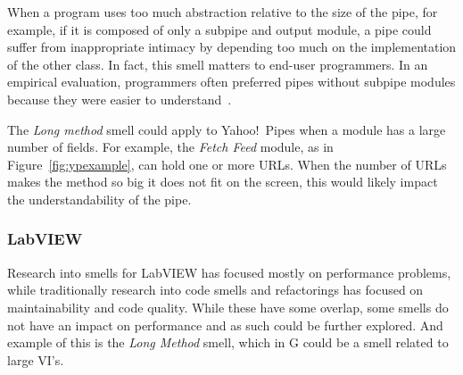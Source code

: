 \documentclass[10pt,conference,compsocconf]{IEEEtran}
\begin{document}
When a program uses too much abstraction relative to the size of the pipe, for example, if it is composed of only a subpipe and output module, a pipe could suffer from inappropriate intimacy by depending too much on the implementation of the other class. In fact, this smell matters to end-user programmers.  In an empirical evaluation, programmers often preferred pipes without subpipe modules because they were easier to understand~\cite{StoleeTSE2013}. 

The \emph{Long method} smell could apply to Yahoo!\ Pipes when a module has a large number of fields. For example, the \emph{Fetch Feed} module, as in Figure~\ref{fig:ypexample}, can hold one or more URLs. When the number of URLs makes the method so big it does not fit on the screen, this would likely impact the understandability of the pipe. 

\subsubsection{LabVIEW}

Research into smells for LabVIEW has focused mostly on performance problems, while traditionally research into code smells and refactorings has focused on maintainability and code quality.
While these have some overlap, some smells do not have an impact on performance and as such could be further explored. And example of this is the \emph{Long Method} smell, which in G could be a smell related to large VI's.
\end{document}
